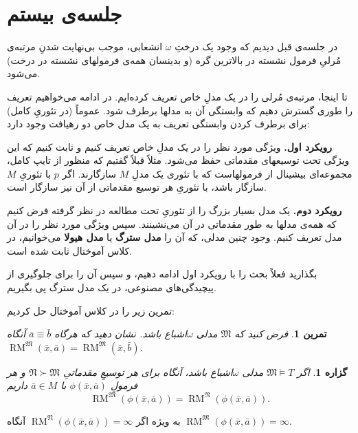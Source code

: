 \documentclass[12pt,a4paper]{report}
\theoremstyle{colorhead}
\newtheorem{tam}{تمرین}
\newtheorem{prop}[thm]{گزاره}
\DeclareMathOperator{\RM}{RM}
\begin{document}
\section{جلسه‌ی بیستم}
در جلسه‌ی قبل دیدیم که وجود یک درختِ 
$\omega$
انشعابی، موجب بی‌نهایت شدنِ‌ مرتبه‌ی مُرلیِ فرمول نشسته در بالاترین گره (و بدینسان
 همه‌ی فرمولهای نشسته در درخت) می‌شود. 
 \par 
تا اینجا، مرتبه‌ی مُرلی را در یک مدلِ خاص تعریف کرده‌ایم. در ادامه می‌خواهیم
 تعریف را طوری گسترش دهیم که وابستگی
آن به مدلها برطرف شود. عموماً (در تئوریِ کامل) برای برطرف کردن وابستگی تعریف به یک مدل خاص
دو رهیافت وجود دارد:
\par 
\textbf{رویکرد اول.}
ویژگی مورد نظر را در یک مدلِ خاص تعریف کنیم و ثابت کنیم که این ویژگی تحت توسیعهای مقدماتی حفظ می‌شود. مثلاً 
قبلاً گفتیم که منظور از تایپ کامل، مجموعه‌ای بیشینال از فرمولهاست که با تئوری یک مدلِ
$M$
سازگارند. اگر 
$p$
با تئوریِ
$M$
سازگار باشد، با تئوریِ هر توسیع مقدماتی از آن نیز سازگار است. 
\par 
\textbf{رویکرد دوم. }
یک مدل بسیار بزرگ را از تئوریِ تحت مطالعه در نظر گرفته فرض کنیم که همه‌ی مدلها به طور مقدماتی در آن می‌نشینند. سپس ویژگی مورد نظر را در آن مدل تعریف کنیم. وجود چنین مدلی، که آن را 
\textbf{مدل سترگ }
یا 
\textbf{مدل هیولا}
می‌خوانیم، در کلاس آموختال ثابت شده است. 
\par 
بگذارید فعلاً بحث را با رویکرد اول ادامه دهیم، و سپس آن را
 برای جلوگیری از پیچیدگی‌های مصنوعی،  در یک مدل سترگ پی بگیریم. 
 \par 
تمرین زیر را در کلاس آموختال حل کردیم:
\begin{tam}
	فرض کنید که
	$\mathfrak{M}$
	مدلی
$\omega$اشباع
	باشد. نشان دهید که هرگاه
$\bar{a}\equiv \bar{b}$
آنگاه
$\RM^\mathfrak{M}(\bar{x},\bar{a})=\RM^\mathfrak{M}(\bar{x},\bar{b})$.
	\end{tam}
\begin{prop}
	اگر
	$\mathfrak{M}\models T$
مدلی
$\omega$اشباع 
باشد، آنگاه برای هر توسیعِ مقدماتیِ
$\mathfrak{N}\succ \mathfrak{M}$
و هر فرمولِ
$\phi(\bar{x},\bar{a})$
با
$\bar{a}\in M$
داریم
\[
\RM^\mathfrak{M}(\phi(\bar{x},\bar{a}))=\RM^\mathfrak{N}(\phi(\bar{x},\bar{a})).
\]
	\end{prop}
به ويژه اگر
$\RM^\mathfrak{N}(\phi(\bar{x},\bar{a}))=\infty$
آنگاه
$\RM^\mathfrak{M}(\phi(\bar{x},\bar{a}))=\infty$.
\end{document}
